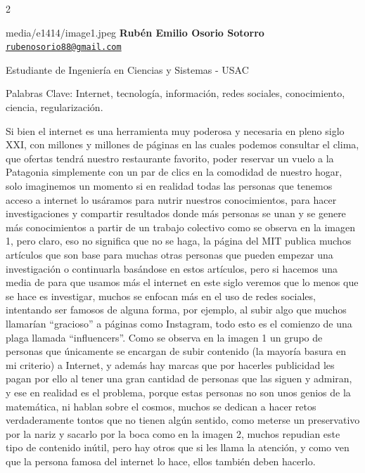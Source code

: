 \documentclass[12pt,spanish,Letterpaper,openany]{book}
\let\BeginKnitrBlock\begin \let\EndKnitrBlock\end
\begin{document}
\begin {multicols}{2}

\BeginKnitrBlock{photobiography3}{media/e1414/image1.jpeg}
\textbf{Rubén Emilio Osorio Sotorro}\\
\href{mailto:rubenosorio88@gmail.com}{\nolinkurl{rubenosorio88@gmail.com}}

\medskip

Estudiante de Ingeniería en Ciencias y Sistemas - USAC\\

\medskip

Palabras Clave: Internet, tecnología, información, redes sociales, conocimiento, ciencia, regularización.
\EndKnitrBlock{photobiography3}

Si bien el internet es una herramienta muy poderosa y necesaria en pleno siglo XXI, con millones y millones de páginas en las cuales podemos consultar el clima, que ofertas tendrá nuestro restaurante favorito, poder reservar un vuelo a la Patagonia simplemente con un par de clics en la comodidad de nuestro hogar, solo imaginemos un momento si en realidad todas las personas que tenemos acceso a internet lo usáramos para nutrir nuestros conocimientos, para hacer investigaciones y compartir resultados donde más personas se unan y se genere más conocimientos a partir de un trabajo colectivo como se observa en la imagen 1, pero claro, eso no significa que no se haga, la página del MIT publica muchos artículos que son base para muchas otras personas que pueden empezar una investigación o continuarla basándose en estos artículos, pero si hacemos una media de para que usamos más el internet en este siglo veremos que lo menos que se hace es investigar, muchos se enfocan más en el uso de redes sociales, intentando ser famosos de alguna forma, por ejemplo, al subir algo que muchos llamarían ``gracioso'' a páginas como Instagram, todo esto es el comienzo de una plaga llamada ``influencers''. Como se observa en la imagen 1 un grupo de personas que únicamente se encargan de subir contenido (la mayoría basura en mi criterio) a Internet, y además hay marcas que por hacerles publicidad les pagan por ello al tener una gran cantidad de personas que las siguen y admiran, y ese en realidad es el problema, porque estas personas no son unos genios de la matemática, ni hablan sobre el cosmos, muchos se dedican a hacer retos verdaderamente tontos que no tienen algún sentido, como meterse un preservativo por la nariz y sacarlo por la boca como en la imagen 2, muchos repudian este tipo de contenido inútil, pero hay otros que si les llama la atención, y como ven que la persona famosa del internet lo hace, ellos también deben hacerlo.


\end{multicols}
\end{document}
